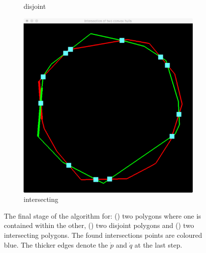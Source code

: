 \begin{figure}
\begin{subfigure}{0.3\textwidth}
			\caption{disjoint}
			\label{subfig:a:results:disjoint}			
		\end{subfigure}		
		\begin{subfigure}{0.3\textwidth}
			\includegraphics[width=\textwidth]{./img/a_intersecting}
			\caption{intersecting}
			\label{subfig:a:results:intersecting}			
		\end{subfigure}				
		\caption{The final stage of the algorithm for: () two polygons where one is contained within the other, () two disjoint polygons and () two intersecting polygons. The found intersections points are coloured blue. The thicker edges denote the $\dot{p}$ and $\dot{q}$ at the last step.}
		\label{fig:a:result}
	\end{figure}

